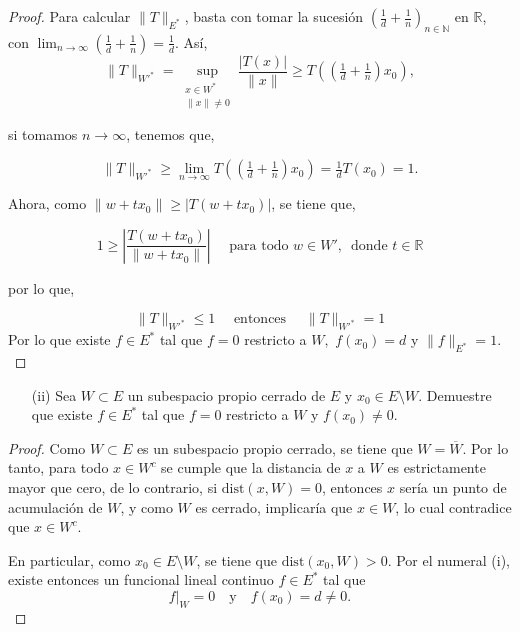 \begin{proof}
Para calcular \(\|T\|_{E^*}\), basta con tomar la sucesión $\left( \tfrac{1}{d} + \tfrac{1}{n} \right)_{n \in \mathbb{N}}$ en $\mathbb{R}$, con \(\lim_{n \to \infty} \left( \tfrac{1}{d} + \tfrac{1}{n} \right) = \tfrac{1}{d}\). Así,
$$
\|T\|_{W'^*} = \sup_{\substack{x \in W^{*}\\ \|x\|\neq 0 }} \dfrac{|T(x)|}{\|x\|} \geq T\left( \left( \tfrac{1}{d} + \tfrac{1}{n} \right) x_0 \right),
$$

si tomamos \(n \to \infty\), tenemos que,

$$
\|T\|_{W'^*} \geq \lim_{n \to \infty} T\left( \left( \tfrac{1}{d} + \tfrac{1}{n} \right)x_0 \right) = \tfrac{1}{d} T(x_0) = 1.
$$

Ahora, como \(\|w + t x_0\| \geq |T(w+ t x_0)|\), se tiene que,

$$
1 \geq \left| \frac{T(w + t x_0)}{\|w + t x_0\|} \right| \quad \text{ para todo } w \in W',\, \text{ donde } t \in \mathbb{R}
$$

por lo que, 

$$
\|T\|_{W'^*} \leq 1 \quad \text{ entonces }\quad \|T\|_{W'^*} = 1
$$
Por lo que existe $f\in E^*$ tal que $f=0$ restricto a $W,$ $f(x_0)=d$ y $\|f\|_{E^*}=1.$
\end{proof}

\vspace{0.3cm}
\begin{itemize}
    \item[(ii)] Sea $W\subset E$ un subespacio propio cerrado de $E$ y $x_0\in E\setminus W.$ Demuestre que existe $f\in E^*$ tal que $f=0$ restricto a $W$ y $f(x_0)\neq 0$. 
\end{itemize}
\begin{proof}
Como $W \subset E$ es un subespacio propio cerrado, se tiene que $W = \overline{W}$. Por lo tanto, para todo $x \in W^c$ se cumple que la distancia de $x$ a $W$ es estrictamente mayor que cero, de lo contrario, si $\mathrm{dist}(x, W) = 0$, entonces $x$ sería un punto de acumulación de $W$, y como $W$ es cerrado, implicaría que $x \in W$, lo cual contradice que $x \in W^c$.

En particular, como $x_0 \in E \setminus W$, se tiene que $\mathrm{dist}(x_0, W) > 0$. Por el numeral (i), existe entonces un funcional lineal continuo $f \in E^*$ tal que
\[
f|_W = 0 \quad \text{y} \quad f(x_0)=d\neq 0.
\]
\end{proof}